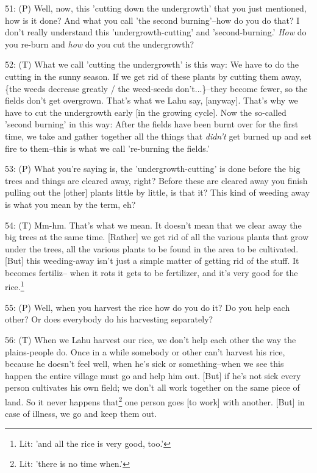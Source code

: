 51: (P) Well, now, this 'cutting down the undergrowth' that you just mentioned,
how is it done? And what you call 'the second burning'--how do you do that? I don't
really understand this 'undergrowth-cutting' and 'second-burning.' \textit{How
}do you re-burn and \textit{how} do you cut the undergrowth?

52: (T) What we call 'cutting the undergrowth' is this way: We have to do the cutting
in the sunny season. If we get rid of these plants by cutting them away, \{the
weeds decrease greatly / the weed-seeds don't...\}--they become fewer, so the fields
don't get overgrown. That's what we Lahu say, [anyway]. That's why we have to cut
the undergrowth early [in the growing cycle]. Now the so-called 'second burning'
in this way: After the fields have been burnt over for the first time, we take
and gather together all the things that \textit{didn't} get burned up and set fire
to them--this is what we call 're-burning the fields.'

53: (P) What you're saying is, the 'undergrowth-cutting' is done before the big
trees and things are cleared away, right? Before these are cleared away you finish
pulling out the [other] plants little by little, is that it? This kind of weeding
away is what you mean by the term, eh?

54: (T) Mm-hm. That's what we mean. It doesn't mean that we clear away the big
trees at the same time. [Rather] we get rid of all the various plants that grow
under the trees, all the various plants to be found in the area to be cultivated.
[But] this weeding-away isn't just a simple matter of getting rid of the stuff.
It becomes fertiliz-- when it rots it gets to be fertilizer, and it's very good
for the rice.\footnote{Lit: 'and all the rice is very good, too.'}

55: (P) Well, when you harvest the rice how do you do it? Do you help each other?
Or does everybody do his harvesting separately?

56: (T) When we Lahu harvest our rice, we don't help each other the way the plains-people
do. Once in a while somebody or other can't harvest his rice, because he doesn't
feel well, when he's sick or something--when we see this happen the entire village
must go and help him out. [But] if he's not sick every person cultivates his own
field; we don't all work together on the same piece of land. So it never happens
that\footnote{Lit: 'there is no time when.'} one person goes [to work] with another. [But] in case of illness, we go
and keep them out.


